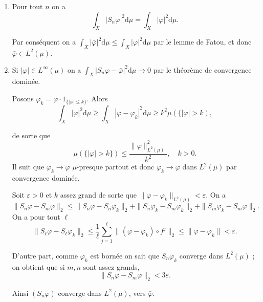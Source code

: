 \documentclass[a4paper,10pt,openany]{article}
\theoremstyle{plain}
\theoremstyle{definition}
\newcommand{\dd}{\mathrm{d}}
\begin{document}
\vspace{0.6cm}

 \vspace{1.5mm} 

\begin{enumerate}
\item Pour tout $n$ on a 
$$
\int_X |S_n \varphi|^2 \dd \mu = \int_X |\varphi|^2 \dd \mu.
$$

Par cons\'equent on a $\int_X |\bar \varphi|^2 \dd \mu \leqslant \int_X |\varphi|^2 \dd \mu$ par le lemme de Fatou, et donc $\bar \varphi \in L^2(\mu).$ 
\item Si $|\varphi| \in L^\infty(\mu)$ on a $\int_X |S_n \varphi - \bar \varphi|^2 \dd \mu \to 0$ par le th\'eor\`eme de convergence domin\'ee.

Posons $\varphi_k = \varphi \cdot1_{\{|\varphi|\leqslant k\}}.$ Alors 
$$
\int_X |\varphi|^2 \dd \mu \geqslant \int_X |\varphi - \varphi_k|^2 \dd \mu \geqslant k^2 \mu(\{|\varphi| > k),
$$

de sorte que 
$$
\mu(\{|\varphi|> k\}) \leqslant \frac{\|\varphi\|_{L^2(\mu)}^2}{k^2}, \quad k > 0.
$$
 Il suit que $\varphi_k \to \varphi$ $\mu$-presque partout et donc $\varphi_k \to \varphi$ dans $L^2(\mu)$ par convergence domin\'ee.



Soit $\varepsilon > 0$ et $k$ assez grand de sorte que $\|\varphi-\varphi_k\|_{L^2(\mu)} < \varepsilon.$  On a 
$$
\|S_n\varphi - S_m\varphi\|_{2} \leqslant\|S_n\varphi - S_n\varphi_k\|_2 + \|S_n \varphi_k - S_m \varphi_k\|_2 + \|S_m \varphi_k - S_m \varphi\|_2.
$$
On a pour tout $\ell$
$$
\|S_\ell \varphi - S_\ell \varphi_k\|_2 \leqslant \frac{1}{\ell} \sum_{j=1}^\ell \|(\varphi - \varphi_k) \circ f^j\|_2 \leqslant \|\varphi - \varphi_k\| < \varepsilon.
$$

D'autre part, comme $\varphi_k$ est born\'ee on sait que $S_n \varphi_k$ converge dans $L^2(\mu)$ ; on obtient que si $m,n$ sont assez grands, 
$$
\|S_n \varphi - S_m \varphi\|_2 < 3 \varepsilon.
$$

Ainsi $(S_n \varphi)$ converge dans $L^2(\mu)$, vers $\bar \varphi.$
\end{enumerate}
\vspace{0.6cm}


 \vspace{1.5mm} 
\end{document}
